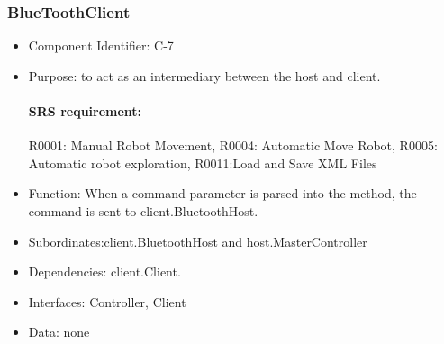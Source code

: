 \documentclass[11pt, a4paper]{report}
\begin{document}
\subsubsection{BlueToothClient}
\begin{itemize}
\item Component Identifier: C-7
\item Purpose: to act as an intermediary between the host and client.
\paragraph{SRS requirement:}R0001: Manual Robot Movement, R0004: Automatic Move Robot,
R0005: Automatic robot exploration, R0011:Load and Save XML Files
\item Function: When a command parameter is parsed into the method, the command is sent to 
client.BluetoothHost.
\item Subordinates:client.BluetoothHost and host.MasterController
\item Dependencies: client.Client.
\item Interfaces: Controller, Client
\item Data: none
\end{itemize}
\end{document}
